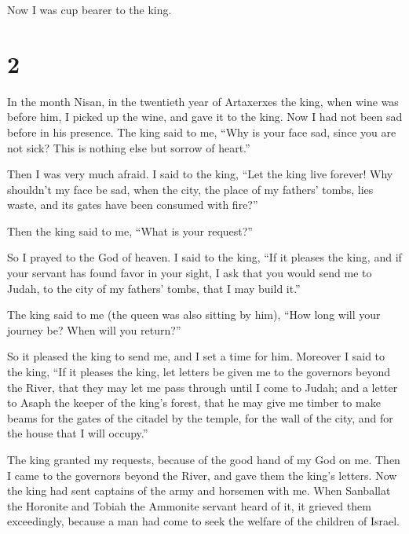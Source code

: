Now I was cup bearer to the king.

\hypertarget{section-1}{%
\section{2}\label{section-1}}

 In the month Nisan, in the twentieth year of Artaxerxes the
king, when wine was before him, I picked up the wine, and gave it to the
king. Now I had not been sad before in his presence.  The
king said to me, ``Why is your face sad, since you are not sick? This is
nothing else but sorrow of heart.''

Then I was very much afraid.  I said to the king, ``Let the
king live forever! Why shouldn't my face be sad, when the city, the
place of my fathers' tombs, lies waste, and its gates have been consumed
with fire?''

 Then the king said to me, ``What is your request?''

So I prayed to the God of heaven.  I said to the king, ``If
it pleases the king, and if your servant has found favor in your sight,
I ask that you would send me to Judah, to the city of my fathers' tombs,
that I may build it.''

 The king said to me (the queen was also sitting by him),
``How long will your journey be? When will you return?''

So it pleased the king to send me, and I set a time for him.
 Moreover I said to the king, ``If it pleases the king, let
letters be given me to the governors beyond the River, that they may let
me pass through until I come to Judah;  and a letter to
Asaph the keeper of the king's forest, that he may give me timber to
make beams for the gates of the citadel by the temple, for the wall of
the city, and for the house that I will occupy.''

The king granted my requests, because of the good hand of my God on me.
 Then I came to the governors beyond the River, and gave
them the king's letters. Now the king had sent captains of the army and
horsemen with me.  When Sanballat the Horonite and Tobiah
the Ammonite servant heard of it, it grieved them exceedingly, because a
man had come to seek the welfare of the children of Israel.

